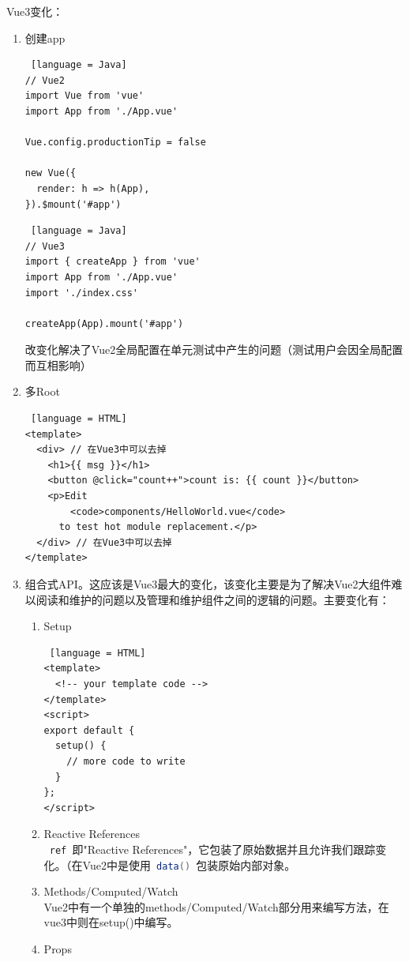 Vue3变化：
\begin{enumerate}
    \item 创建app
          \begin{lstlisting} [language = Java]
// Vue2
import Vue from 'vue'
import App from './App.vue'

Vue.config.productionTip = false

new Vue({
  render: h => h(App),
}).$mount('#app')
    \end{lstlisting}
          \begin{lstlisting} [language = Java]
// Vue3
import { createApp } from 'vue'
import App from './App.vue'
import './index.css'

createApp(App).mount('#app')
    \end{lstlisting}
          改变化解决了Vue2全局配置在单元测试中产生的问题（测试用户会因全局配置而互相影响）
    \item 多Root
          \begin{lstlisting} [language = HTML]
<template>
  <div> // 在Vue3中可以去掉
    <h1>{{ msg }}</h1>
    <button @click="count++">count is: {{ count }}</button>
    <p>Edit 
        <code>components/HelloWorld.vue</code> 
      to test hot module replacement.</p>
  </div> // 在Vue3中可以去掉
</template>
\end{lstlisting}
    \item 组合式API。这应该是Vue3最大的变化，该变化主要是为了解决Vue2大组件难以阅读和维护的问题以及管理和维护组件之间的逻辑的问题。主要变化有：
          \begin{enumerate}
              \item Setup
                    \begin{lstlisting} [language = HTML]
<template>
  <!-- your template code -->
</template>
<script>
export default {
  setup() {
    // more code to write
  }
};
</script>
            \end{lstlisting}
              \item Reactive References\\
                    \lstinline[language = Java]| ref |即"Reactive References"，它包装了原始数据并且允许我们跟踪变化。（在Vue2中是使用\lstinline[language = Java]| data() |包装原始内部对象。
              \item Methods/Computed/Watch\\
                    Vue2中有一个单独的methods/Computed/Watch部分用来编写方法，在vue3中则在setup()中编写。
              \item Props\\

\end{enumerate}
\end{enumerate}
